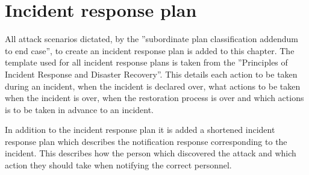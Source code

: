 \section{Incident response plan}

All attack scenarios dictated, by the ”subordinate plan classification addendum to end case”, to create an incident response plan is added to this chapter. The template used for all incident response plans is taken from the ”Principles of Incident Response and Disaster Recovery”. This details each action to be taken during an incident, when the incident is declared over, what actions to be taken when the incident is over, when the restoration process is over and which actions is to be taken in advance to an incident.

In addition to the incident response plan it is added a shortened incident response plan which describes the notification response corresponding to the incident. This describes how the person which discovered the attack and which action they should take when notifying the correct personnel.

